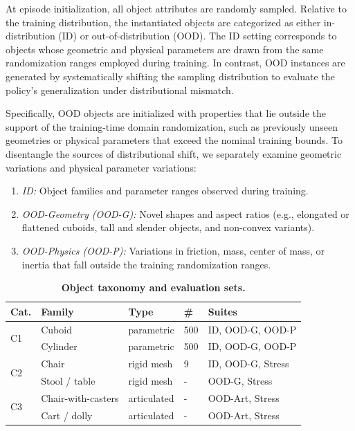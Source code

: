 At episode initialization, all object attributes are randomly sampled. Relative to the training distribution, the instantiated objects are categorized as either in-distribution (ID) or out-of-distribution (OOD). The ID setting corresponds to objects whose geometric and physical parameters are drawn from the same randomization ranges employed during training. In contrast, OOD instances are generated by systematically shifting the sampling distribution to evaluate the policy’s generalization under distributional mismatch.

Specifically, OOD objects are initialized with properties that lie outside the support of the training-time domain randomization, such as previously unseen geometries or physical parameters that exceed the nominal training bounds. To disentangle the sources of distributional shift, we separately examine geometric variations and physical parameter variations:
\begin{enumerate}
    \item \textit{ID: } Object families and parameter ranges observed during training.
    \item \textit{OOD-Geometry (OOD-G): }Novel shapes and aspect ratios (e.g., elongated or flattened cuboids, tall and slender objects, and non-convex variants).
    \item \textit{OOD-Physics (OOD-P):} Variations in friction, mass, center of mass, or inertia that fall outside the training randomization ranges.
\end{enumerate}


\begin{table}[t]
\caption{\textbf{Object taxonomy and evaluation sets.} }
\label{tab:object_sets}
\renewcommand{\arraystretch}{1.05}
\setlength{\tabcolsep}{4pt}
\small
\begin{tabular}{@{}p{0.6cm}p{2.4cm}p{1.35cm}p{0.5cm}p{2.8cm}@{}}
\toprule
\textbf{Cat.} & \textbf{Family} & \textbf{Type} & \textbf{\#} & \textbf{Suites} \\
\midrule
\multirow{2}{*}{C1} & Cuboid & parametric & 500 & ID, OOD-G, OOD-P \\
                    & Cylinder & parametric & 500 & ID, OOD-G, OOD-P \\
\midrule
\multirow{2}{*}{C2} & Chair & rigid mesh & 9 & ID, OOD-G, Stress \\
                    & Stool / table & rigid mesh & - & OOD-G, Stress \\
\midrule
\multirow{2}{*}{C3} & Chair-with-casters & articulated & - & OOD-Art, Stress \\
                    & Cart / dolly & articulated & - & OOD-Art, Stress \\
\bottomrule
\end{tabular}
\vspace{-0.6em}
\end{table}



